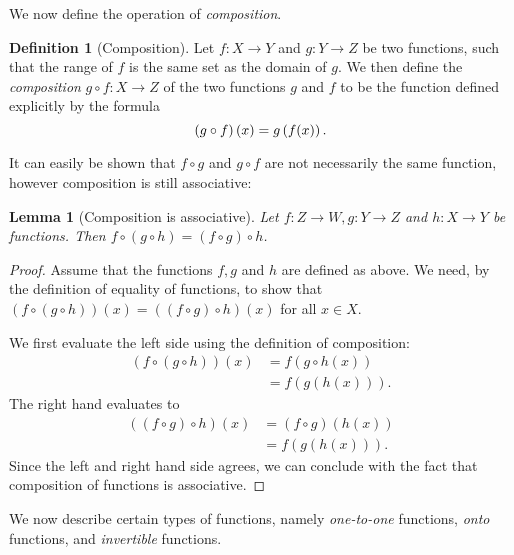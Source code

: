 \documentclass[a4paper, twocolumn]{report}
\newcounter{dummy} \numberwithin{dummy}{section}
\newtheorem{lma}[dummy]{Lemma}
\theoremstyle{definition}
\newtheorem{defn}[dummy]{Definition}
\theoremstyle{solution}
\begin{document}
We now define the operation of \textit{composition}.

\begin{defn}[Composition]
  \label{defn_3310}
  Let $f : X \rightarrow Y$ and $g : Y \rightarrow Z$ be two functions, such
  that the range of $f$ is the same set as the domain of $g$.  We then define
  the \textit{composition} $g \circ f : X \rightarrow Z$ of the two functions
  $g$ and $f$ to be the function defined explicitly by the formula
  \begin{equation}
    \notag
    \left( g\circ f \right)(x) = g\left( f(x) \right).
  \end{equation}
\end{defn}
\addtocounter{dummy}{1}
It can easily be shown that $f \circ g$ and $g \circ f$ are not necessarily the
same function, however composition is still associative:

\begin{lma}[Composition is associative]
  \label{lma_3312}
  Let $f : Z \rightarrow W, g : Y \rightarrow Z$ and $h : X \rightarrow Y$ be
  functions. Then $f \circ (g \circ h) = (f \circ g) \circ h$.
\end{lma}

\begin{proof}
  Assume that the functions $f, g$ and $h$ are defined as above.  We need, by
  the definition of equality of functions, to show that $(f \circ (g\circ h))(x)
  = \left( (f \circ g) \circ h \right)(x)$ for all $x \in X$. 

  We first evaluate the left side using the definition of composition:
  \begin{align*}
    \left( f \circ (g \circ h) \right)(x) &= f( g \circ h(x))\\
    &= f(g(h(x))).
  \end{align*}
  The right hand evaluates to
  \begin{align*}
    \left( (f\circ g) \circ h \right)(x) &= (f \circ g)(h(x))\\
    &= f(g(h(x))).
  \end{align*}
  Since the left and right hand side agrees, we can conclude with the fact that
  composition of functions is associative.
\end{proof}
\addtocounter{dummy}{1}

We now describe certain types of functions, namely \textit{one-to-one}
functions, \textit{onto} functions, and \textit{invertible} functions.
\end{document}
